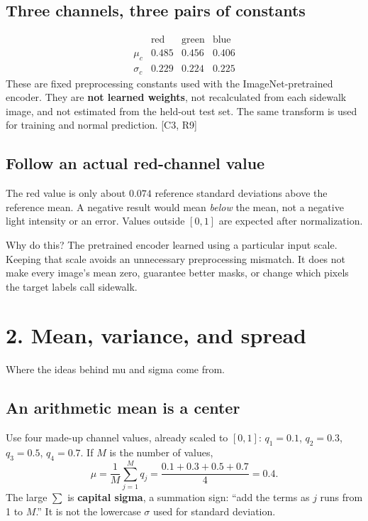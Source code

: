 \documentclass[11pt,letterpaper]{article}
\newcommand{\note}[1]{\par\vspace{3pt}\begingroup\setlength{\fboxsep}{8pt}%
 \colorbox{pale}{\parbox{\dimexpr\linewidth-2\fboxsep\relax}{#1}}\endgroup\par\vspace{3pt}}
\newcommand{\guidepage}[2]{\clearpage\pdfbookmark[0]{#1}{guide-\thepage}\section*{#1}{\sffamily\color{muted}#2}\par\vspace{5pt}}
\begin{document}
\subsection*{Three channels, three pairs of constants}
\[
\begin{array}{c|ccc}
 &\text{red}&\text{green}&\text{blue}\\\hline
\mu_c&0.485&0.456&0.406\\
\sigma_c&0.229&0.224&0.225
\end{array}
\]
These are fixed preprocessing constants used with the ImageNet-pretrained encoder. They are \textbf{not learned weights}, not recalculated from each sidewalk image, and not estimated from the held-out test set. The same transform is used for training and normal prediction. [C3, R9]

\subsection*{Follow an actual red-channel value}
\begin{center}
\end{center}
The red value is only about $0.074$ reference standard deviations above the reference mean. A negative result would mean \emph{below} the mean, not a negative light intensity or an error. Values outside $[0,1]$ are expected after normalization.

\note{Why do this? The pretrained encoder learned using a particular input scale. Keeping that scale avoids an unnecessary preprocessing mismatch. It does not make every image's mean zero, guarantee better masks, or change which pixels the target labels call sidewalk.}

\guidepage{2. Mean, variance, and spread}{Where the ideas behind mu and sigma come from.}
\subsection*{An arithmetic mean is a center}
Use four made-up channel values, already scaled to $[0,1]$: $q_1=0.1$, $q_2=0.3$, $q_3=0.5$, $q_4=0.7$. If $M$ is the number of values,
\[
\mu=\frac{1}{M}\sum_{j=1}^{M}q_j
=\frac{0.1+0.3+0.5+0.7}{4}=0.4.
\]
The large $\sum$ is \textbf{capital sigma}, a summation sign: ``add the terms as $j$ runs from 1 to $M$.'' It is not the lowercase $\sigma$ used for standard deviation.
\end{document}
